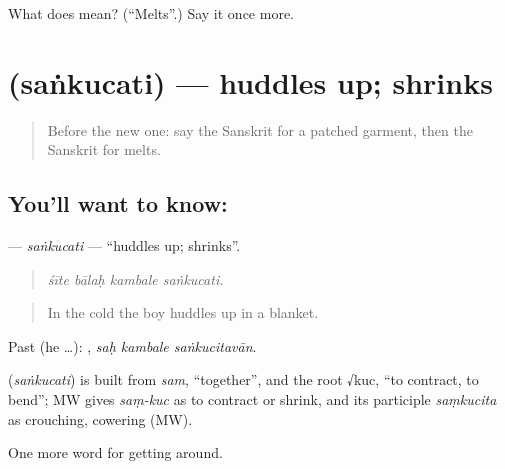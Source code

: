\begin{tcolorbox}[breakable,colback=teal!4,colframe=teal!35!black,title={Before you move on}]
What does  mean? (\textquotedblleft{}Melts\textquotedblright{}.) Say it once more.
\end{tcolorbox}
\section[\texorpdfstring{\sk{संकुचति} (saṅkucati)}{संकुचति (saṅkucati)}]{ (saṅkucati) — huddles up; shrinks}

\label{lesson:SA-C440-sankucati}



\begin{quote}
Before the new one: say the Sanskrit for a patched garment, then the Sanskrit for melts.
\end{quote}

\subsection*{You'll want to know: }
\textbf{} — \emph{saṅkucati} — \textquotedblleft{}huddles up; shrinks\textquotedblright{}.

\begin{quote}
   
\end{quote}

\begin{quote}
\emph{śīte bālaḥ kambale saṅkucati.}
\end{quote}

\begin{quote}
In the cold the boy huddles up in a blanket.
\end{quote}

Past (he …):   , \emph{saḥ kambale saṅkucitavān}.

\begin{cousinweb}
\textbf{} (\emph{saṅkucati}) is built from \emph{sam}, \textquotedblleft{}together\textquotedblright{}, and the root √kuc, \textquotedblleft{}to contract, to bend\textquotedblright{}; MW gives \emph{saṃ-kuc} as to contract or shrink, and its participle \emph{saṃkucita} as crouching, cowering (MW).
\end{cousinweb}

\begin{grammarlens}[title={What you've built}]
One more word for getting around.
\end{grammarlens}

